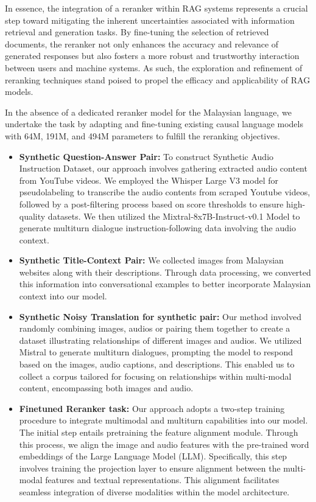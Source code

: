 \documentclass[preprint]{article}
\begin{document}
In essence, the integration of a reranker within RAG systems represents a crucial step toward mitigating the inherent uncertainties associated with information retrieval and generation tasks. By fine-tuning the selection of retrieved documents, the reranker not only enhances the accuracy and relevance of generated responses but also fosters a more robust and trustworthy interaction between users and machine systems. As such, the exploration and refinement of reranking techniques stand poised to propel the efficacy and applicability of RAG models.

In the absence of a dedicated reranker model for the Malaysian language, we undertake the task by adapting and fine-tuning existing causal language models with 64M, 191M, and 494M parameters to fulfill the reranking objectives.

\begin{itemize}

  \item \textbf{Synthetic Question-Answer Pair:} To construct Synthetic Audio Instruction Dataset, our approach involves gathering extracted audio content from YouTube videos. We  employed the Whisper Large V3 model for pseudolabeling to transcribe the audio contents from scraped Youtube videos, followed by a post-filtering process based on score thresholds to ensure high-quality datasets. We then utilized the Mixtral-8x7B-Instruct-v0.1 Model to generate multiturn dialogue instruction-following data involving the audio context.

  \item \textbf{Synthetic Title-Context Pair:}  We collected images from Malaysian websites along with their descriptions. Through data processing, we converted this information into conversational examples to better incorporate Malaysian context into our model.

  \item \textbf{Synthetic Noisy Translation for synthetic pair:} Our method involved randomly combining images, audios or pairing them together to create a dataset illustrating relationships of different images and audios. We utilized Mistral to generate multiturn dialogues, prompting the model to respond based on the images, audio captions, and descriptions. This enabled us to collect a corpus tailored for focusing on relationships within multi-modal content, encompassing both images and audio.

  \item \textbf{Finetuned Reranker task:} Our approach adopts a two-step training procedure to integrate multimodal and multiturn capabilities into our model. The initial step entails pretraining the feature alignment module. Through this process, we align the image and audio features with the pre-trained word embeddings of the Large Language Model (LLM). Specifically, this step involves training the projection layer to ensure alignment between the multi-modal features and textual representations. This alignment facilitates seamless integration of diverse modalities within the model architecture.

\end{itemize}
\end{document}
